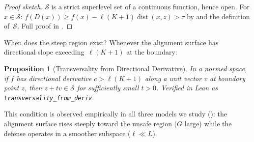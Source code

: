 \documentclass{article}
\newtheorem{proposition}[theorem]{Proposition}
\newcommand{\dist}{\operatorname{dist}}
\begin{document}
\begin{proof}[Proof sketch]
$\mathcal{S}$ is a strict superlevel set of a continuous function,
hence open. For $x \in \mathcal{S}$:
$f(D(x)) \geq f(x) - \ell(K+1)\dist(x,z) > \tau$
by  and the definition of~$\mathcal{S}$.
Full proof in .
\end{proof}

When does the steep region exist? Whenever the alignment surface has
directional slope exceeding~$\ell(K+1)$ at the boundary:

\begin{proposition}[Transversality from Directional Derivative]
\label{prop:transversality}
In a normed space, if $f$ has directional derivative $c > \ell(K+1)$
along a unit vector $v$ at boundary point $z$, then
$z + tv \in \mathcal{S}$ for sufficiently small $t > 0$.
Verified in Lean as \texttt{transversality\_from\_deriv}.
\end{proposition}

This condition is observed empirically in all three models we study
(): the alignment surface rises steeply toward
the unsafe region ($G$ large) while the defense operates in a
smoother subspace ($\ell \ll L$).
\end{document}
